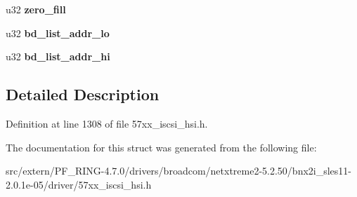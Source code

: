 \begin{DoxyCompactItemize}
\item 
\hypertarget{structbnx2i__text__request_adbedff23061e71d14072ec72e5e71034}{
u32 {\bfseries zero\_\-fill}}
\label{structbnx2i__text__request_adbedff23061e71d14072ec72e5e71034}

\item 
\hypertarget{structbnx2i__text__request_aa4417129c88fb77b33378bb9af96f406}{
u32 {\bfseries bd\_\-list\_\-addr\_\-lo}}
\label{structbnx2i__text__request_aa4417129c88fb77b33378bb9af96f406}

\item 
\hypertarget{structbnx2i__text__request_a83be1719c5675d38ff41e624754c0105}{
u32 {\bfseries bd\_\-list\_\-addr\_\-hi}}
\label{structbnx2i__text__request_a83be1719c5675d38ff41e624754c0105}

\end{DoxyCompactItemize}


\subsection{Detailed Description}


Definition at line 1308 of file 57xx\_\-iscsi\_\-hsi.h.



The documentation for this struct was generated from the following file:\begin{DoxyCompactItemize}
\item 
src/extern/PF\_\-RING-\/4.7.0/drivers/broadcom/netxtreme2-\/5.2.50/bnx2i\_\-sles11-\/2.0.1e-\/05/driver/57xx\_\-iscsi\_\-hsi.h\end{DoxyCompactItemize}
